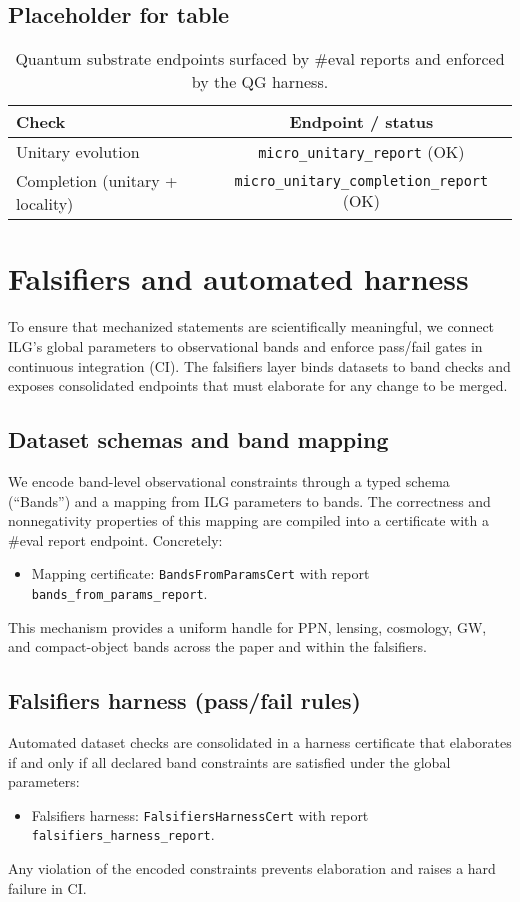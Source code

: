 \documentclass[aps,prd,twocolumn,superscriptaddress,nofootinbib,floatfix,longbibliography]{revtex4-2}
\newcommand{\lean}[1]{\texttt{#1}}
\begin{document}
\subsection{Placeholder for table}
\begin{table}[t]
  \centering
  \begin{tabular}{l c}
    \toprule
    Check & Endpoint / status \\
    \midrule
    Unitary evolution & \texttt{micro\_unitary\_report} (OK) \\
    Completion (unitary + locality) & \texttt{micro\_unitary\_completion\_report} (OK) \\
    \bottomrule
  \end{tabular}
  \caption{Quantum substrate endpoints surfaced by \#eval reports and enforced by the QG harness.}
  \label{tab:quantum-endpoints}
\end{table}

\section{Falsifiers and automated harness}\label{sec:falsifiers}

To ensure that mechanized statements are scientifically meaningful, we connect ILG's global parameters to observational bands and enforce pass/fail gates in continuous integration (CI). The falsifiers layer binds datasets to band checks and exposes consolidated endpoints that must elaborate for any change to be merged.

\subsection{Dataset schemas and band mapping}
We encode band-level observational constraints through a typed schema (``Bands'') and a mapping from ILG parameters to bands. The correctness and nonnegativity properties of this mapping are compiled into a certificate with a \#eval report endpoint. Concretely:
\begin{itemize}
  \item Mapping certificate: \lean{BandsFromParamsCert} with report \lean{bands_from_params_report}.
\end{itemize}
This mechanism provides a uniform handle for PPN, lensing, cosmology, GW, and compact-object bands across the paper and within the falsifiers.

\subsection{Falsifiers harness (pass/fail rules)}
Automated dataset checks are consolidated in a harness certificate that elaborates if and only if all declared band constraints are satisfied under the global parameters:
\begin{itemize}
  \item Falsifiers harness: \lean{FalsifiersHarnessCert} with report \lean{falsifiers_harness_report}.
\end{itemize}
Any violation of the encoded constraints prevents elaboration and raises a hard failure in CI.
\end{document}
